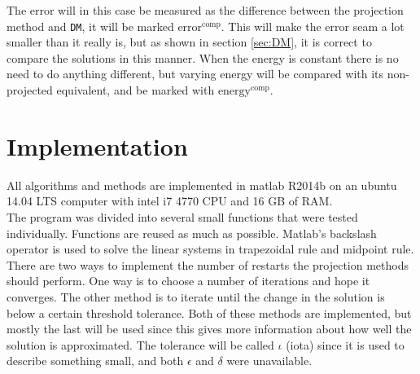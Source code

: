 The error will in this case be measured as the difference between the projection method and \texttt{DM}, it will be marked $\text{error}^{\text{comp}}$. This will make the error seam a lot smaller than it really is, but as shown in section \ref{sec:DM}, it is correct to compare the solutions in this manner. When the energy is constant there is no need to do anything different, but varying energy will be compared with its non-projected equivalent, and be marked with $\text{energy}^{\text{comp}}$.

\section{Implementation} %
\label{sec:praktisk}
All algorithms and methods are implemented in matlab R2014b on an ubuntu 14.04 LTS computer with intel i7 4770 CPU and 16 GB of RAM. \\
The program was divided into several small functions that were tested individually. Functions are reused as much as possible.
Matlab's backslash operator is used to solve the linear systems in trapezoidal rule and midpoint rule. \\

There are two ways to implement the number of restarts the projection methods should perform. One way is to choose a number of iterations and hope it converges. The other method is to iterate until the change in the solution is below a certain threshold tolerance. Both of these methods are implemented, but mostly the last will be used since this gives more information about how well the solution is approximated. The tolerance will be called $\iota$ (iota) since it is used to describe something small\cite{iota}, and both $\epsilon$ and $\delta$ were unavailable.


